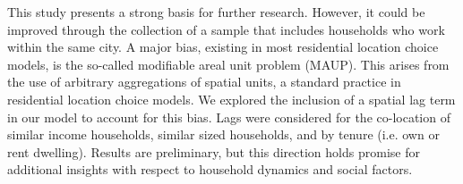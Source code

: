 This study presents a strong basis for further research. However, it could be improved through the collection of a sample that includes households who work within the same city. A major bias, existing in most residential location choice models, is the so-called modifiable areal unit problem (MAUP). This arises from the use of arbitrary aggregations of spatial units, a standard practice in residential location choice models. We explored the inclusion of a spatial lag term in our model to account for this bias. Lags were considered for the co-location of similar income households, similar sized households, and by tenure (i.e. own or rent dwelling). Results are preliminary, but this direction holds promise for additional insights with respect to household dynamics and social factors.